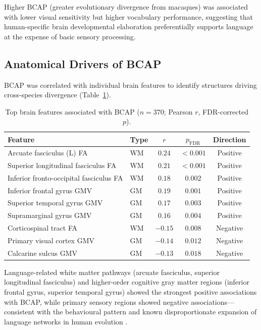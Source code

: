 \documentclass[11pt]{article}
\begin{document}
Higher BCAP (greater evolutionary divergence from macaques) was associated with lower visual sensitivity but higher vocabulary performance, suggesting that human-specific brain developmental elaboration preferentially supports language at the expense of basic sensory processing.

\subsection{Anatomical Drivers of BCAP}

BCAP was correlated with individual brain features to identify structures driving cross-species divergence (Table~\ref{tab:bcap_anat}).

\begin{table}[H]
\centering
\caption{Top brain features associated with BCAP ($n = 370$; Pearson $r$, FDR-corrected $p$).}
\label{tab:bcap_anat}
\begin{tabular}{llccc}
\toprule
Feature & Type & $r$ & $p_{\mathrm{FDR}}$ & Direction \\
\midrule
Arcuate fasciculus (L) FA & WM & $0.24$ & $< 0.001$ & Positive \\
Superior longitudinal fasciculus FA & WM & $0.21$ & $< 0.001$ & Positive \\
Inferior fronto-occipital fasciculus FA & WM & $0.18$ & $0.002$ & Positive \\
Inferior frontal gyrus GMV & GM & $0.19$ & $0.001$ & Positive \\
Superior temporal gyrus GMV & GM & $0.17$ & $0.003$ & Positive \\
Supramarginal gyrus GMV & GM & $0.16$ & $0.004$ & Positive \\
Corticospinal tract FA & WM & $-0.15$ & $0.008$ & Negative \\
Primary visual cortex GMV & GM & $-0.14$ & $0.012$ & Negative \\
Calcarine sulcus GMV & GM & $-0.13$ & $0.018$ & Negative \\
\bottomrule
\end{tabular}
\end{table}

Language-related white matter pathways (arcuate fasciculus, superior longitudinal fasciculus) and higher-order cognitive gray matter regions (inferior frontal gyrus, superior temporal gyrus) showed the strongest positive associations with BCAP, while primary sensory regions showed negative associations---consistent with the behavioural pattern and known disproportionate expansion of language networks in human evolution \citep{rilling2008evolution, catani2005perisylvian}.
\end{document}
